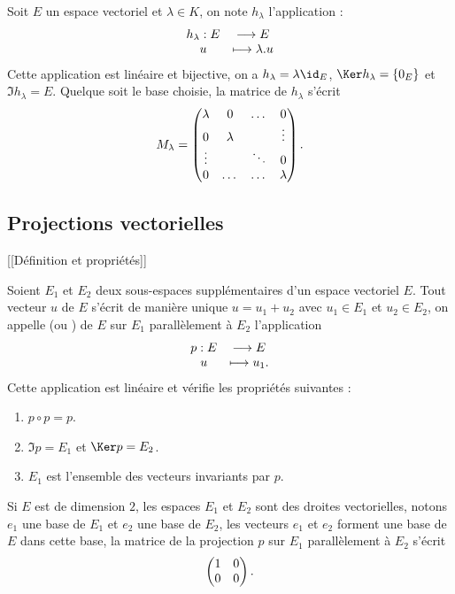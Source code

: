 \documentclass[class=report,crop=false]{standalone}
\begin{document}
Soit $E$ un espace vectoriel et $\lambda\in K$, on note $h_\lambda$ l'application :
$$\begin{array}{cc}h_\lambda : E &\longrightarrow E\cr u & \longmapsto \lambda.u\end{array}$$
Cette application est linéaire et bijective, on a $h_\lambda=\lambda\id_E$, $\Ker h_\lambda=\{0_E\}$ et $\Im h_\lambda=E$. Quelque soit le base choisie, la matrice de $h_\lambda$ s'écrit
$$M_\lambda=\left(\begin{matrix}\lambda&0&\dots&0\cr 0&\lambda& &\vdots\cr\vdots& &\ddots&0\cr0&\dots&\dots&\lambda\end{matrix}\right).$$

\subsection{Projections vectorielles} 



[[Définition et propriétés]]

\begin{proposition}
Soient $E_1$ et $E_2$ deux sous-espaces supplémentaires d'un espace vectoriel $E$. 
Tout vecteur $u$ de $E$ s'écrit de manière unique $u=u_1+u_2$ avec 
$u_1\in E_1$ et $u_2\in E_2$, on appelle  (ou ) 
de $E$ sur $E_1$ parallèlement à $E_2$ l'application
$$\begin{array}{cc}p:E&\longrightarrow E\cr u&\longmapsto u_1.\end{array}$$
Cette application est linéaire et vérifie les propriétés suivantes :
\begin{enumerate}
  \item $p\circ p=p$.
  \item $\Im p =E_1$ et $\Ker p=E_2$.
  \item $E_1$ est l'ensemble des vecteurs invariants par $p$.  
\end{enumerate}
\end{proposition}


Si $E$ est de dimension $2$, les espaces $E_1$ et $E_2$ 
sont des droites vectorielles, notons $e_1$ une base de $E_1$ et $e_2$ 
une base de $E_2$, les vecteurs $e_1$ et $e_2$ forment une base de $E$ dans cette base, 
la matrice de la projection $p$ sur $E_1$ parallèlement à $E_2$ s'écrit
$$\left(\begin{matrix}1&0\cr0&0\end{matrix}\right).$$
\end{document}
